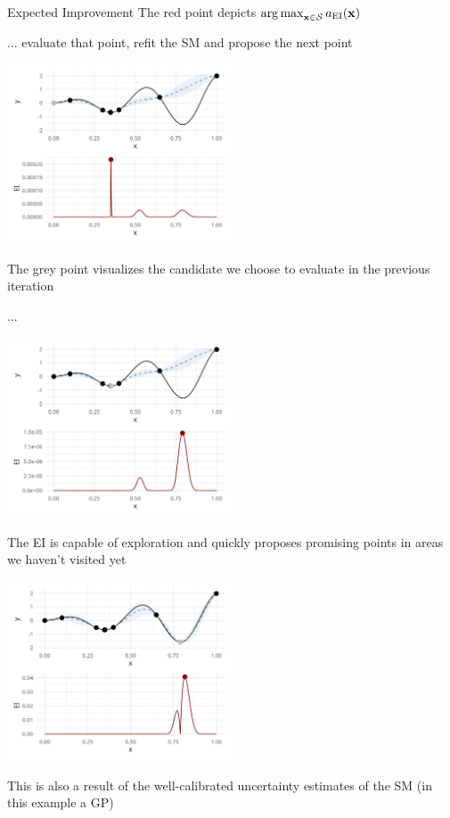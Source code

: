 \documentclass[11pt,compress,t,notes=noshow, xcolor=table]{beamer}
\begin{document}
\begin{vbframe}{Expected Improvement}
The red point depicts $\operatorname{arg\,max}_{\mathbf{x} \in \mathcal{S}} a_{\text{EI}}(\mathbf{x})$

\framebreak

... evaluate that point, refit the SM and propose the next point

\begin{center}
  \includegraphics[width = 0.5\textwidth]{figure_man/bayesian_loop_5.png}
\end{center}

The grey point visualizes the candidate we choose to evaluate in the previous iteration

\framebreak

...

\begin{center}
  \includegraphics[width = 0.5\textwidth]{figure_man/bayesian_loop_6.png}
\end{center}

\framebreak

The EI is capable of exploration and quickly proposes promising points in areas we haven't visited yet

\begin{center}
  \includegraphics[width = 0.5\textwidth]{figure_man/bayesian_loop_7.png}
\end{center}

This is also a result of the well-calibrated uncertainty estimates of the SM (in this example a GP)

\end{vbframe}
\end{document}
